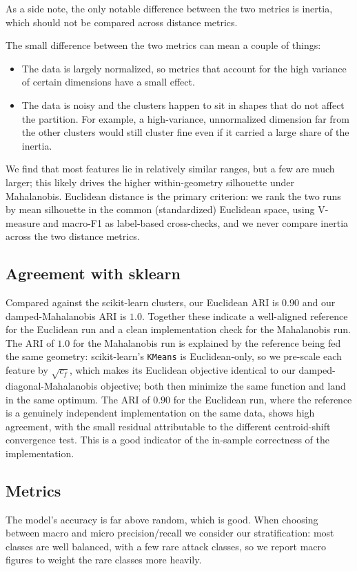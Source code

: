As a side note, the only notable difference between the two metrics is inertia,
which should not be compared across distance metrics.

The small difference between the two metrics can mean a couple of things:
\begin{itemize}
  \item The data is largely normalized, so metrics that account for the high
    variance of certain dimensions have a small effect.
  \item The data is noisy and the clusters happen to sit in shapes that do not
    affect the partition. For example, a high-variance, unnormalized dimension
    far from the other clusters would still cluster fine even if it carried a
    large share of the inertia.
\end{itemize}
We find that most features lie in relatively similar ranges, but a few are much
larger; this likely drives the higher within-geometry silhouette under
Mahalanobis. Euclidean distance is the primary criterion: we rank the two runs
by mean silhouette in the common (standardized) Euclidean space, using V-measure
and macro-F1 as label-based cross-checks, and we never compare inertia across
the two distance metrics.

\subsection{Agreement with sklearn}
Compared against the scikit-learn clusters, our Euclidean ARI is $0.90$ and our
damped-Mahalanobis ARI is $1.0$. Together these indicate a well-aligned
reference for the Euclidean run and a clean implementation check for the
Mahalanobis run. The ARI of $1.0$ for the Mahalanobis run is explained by the
reference being fed the same geometry: scikit-learn's \texttt{KMeans} is
Euclidean-only, so we pre-scale each feature by $\sqrt{c_f}$, which makes its
Euclidean objective identical to our damped-diagonal-Mahalanobis objective; both
then minimize the same function and land in the same optimum. The ARI of $0.90$
for the Euclidean run, where the reference is a genuinely independent
implementation on the same data, shows high agreement, with the small residual
attributable to the different centroid-shift convergence test. This is a good
indicator of the in-sample correctness of the implementation.

\subsection{Metrics}
The model's accuracy is far above random, which is good. When choosing between
macro and micro precision/recall we consider our stratification: most classes
are well balanced, with a few rare attack classes, so we report macro figures to
weight the rare classes more heavily.

